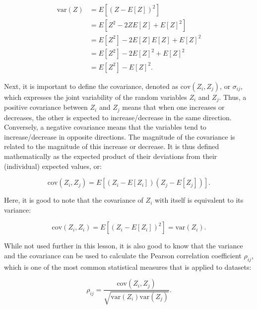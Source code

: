 \begin{align}
\mathrm{var}(Z) &= E\left[{\left(Z-E\left[Z\right]\right)}^2\right] \label{eq:variance1} \\
&= E\left[Z^2 -2ZE\left[Z\right] + E[Z]^2\right] \nonumber \\
&= E\left[Z^2\right] - 2E\left[Z\right]E\left[Z\right] + E\left[Z\right]^2 \nonumber \\
&= E\left[Z^2\right] - 2E\left[Z\right]^2 + E\left[Z\right]^2 \nonumber \\
&= E\left[Z^2\right]-{E[Z]}^2. \label{eq:variance2}
\end{align}

Next, it is important to define the covariance, denoted as \(\mathrm{cov}(Z_i,Z_j)\), or \(\sigma_{ij}\), which expresses the joint variability of the random variables \(Z_i\) and \(Z_j\).
Thus, a positive covariance between \(Z_i\) and \(Z_j\) means that when one increases or decreases, the other is expected to increase/decrease in the same direction.
Conversely, a negative covariance means that the variables tend to increase/decrease in opposite directions.
The magnitude of the covariance is related to the magnitude of this increase or decrease.
It is thus defined mathematically as the expected product of their deviations from their (individual) expected values, or:

\begin{equation}
\label{eq:covariance}
\mathrm{cov}(Z_i,Z_j) = E\left[\left(Z_i-E[Z_i]\right)\left(Z_j-E[Z_j]\right)\right].
\end{equation}

Here, it is good to note that the covariance of \(Z_i\) with itself is equivalent to its variance:

\begin{equation}
\mathrm{cov}(Z_i,Z_i) = E\left[\left(Z_i-E[Z_i]\right)^2\right] = \mathrm{var}(Z_i). \nonumber
\end{equation}

While not used further in this lesson, it is also good to know that the variance and the covariance can be used to calculate the Pearson correlation coefficient \(\rho_{ij}\), which is one of the most common statistical measures that is applied to datasets:

\begin{equation}
\rho_{ij}=\frac{\mathrm{cov}(Z_i, Z_j)}{\sqrt{\mathrm{var}(Z_i) \mathrm{var}(Z_j)}}. \nonumber
\end{equation}

